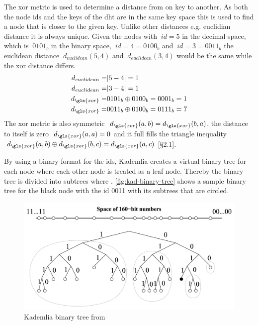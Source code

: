 The \gls{xor} metric is used to determine a distance from on key to another. As both the node ids and the keys of the \gls{dht} are in the same key space this is used to find a node that is closer to the given key. Unlike other distances e.g. euclidian distance it is always unique.
Given the nodes with $\ id = 5 $ in the decimal space, which is  $\ 0101_{b} $ in the binary space, $\ id = 4 = 0100_{b} $ and $\ id = 3 = 0011_{b} $ the euclidean distance $\ d_{euclidean}(5,4) $ and $\ d_{euclidean}(3,4) $ would be the same while the xor distance differs.
\begin{equation}
\begin{aligned}  
    d_ {euclidean} = & | 5-4 | = 1\\
    d_ {euclidean} = & | 3-4 | = 1\\
    d_ {\gls{xor}} = & 0101_{b} \oplus 0100_{b} = 0001_{b} = 1\\
    d_ {\gls{xor}} = & 0011_{b} \oplus 0100_{b} = 0111_{b} = 7\\
  \end{aligned}  
\end{equation}
The \gls{xor} metric is also symmetric $\ d_{\gls{xor}}(a,b) = d_{\gls{xor}}(b,a) $, the distance to itself is zero $\ d_{\gls{xor}}(a,a) = 0 $ and it full fills the triangle inequality $\ d_{\gls{xor}}(a,b) \oplus d_{\gls{xor}}(b,c) = d_{\gls{xor}}(a,c) $ \cite{kademlia}[\S2.1].

By using a binary format for the ids, Kademlia creates a virtual binary tree for each node where each other node is treated as a leaf node. Thereby the binary tree is divided into subtrees where  \cite[\S2]{kademlia}.
\vref{fig:kad-binary-tree} shows a sample binary tree for the black node with the id 0011 with its subtrees that are circled.

\begin{figure}
\centering
\includegraphics[width=1\textwidth]{graphics/kademlia-binary-tree.png}
\caption{Kademlia binary tree from \cite[\S2]{kademlia}}
\label{fig:kad-binary-tree}
\end{figure}

